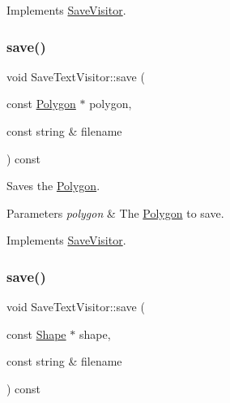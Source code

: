 Implements \hyperlink{class_save_visitor_aa94777a1d367e937294ffd467835dc31}{Save\+Visitor}.

\hypertarget{class_save_text_visitor_a9b4292ce11779caf26556cf6abc5db0f}{}\label{class_save_text_visitor_a9b4292ce11779caf26556cf6abc5db0f} 
\subsubsection{\texorpdfstring{save()}{save()}\hspace{0.1cm}{\footnotesize\ttfamily [4/5]}}
{\footnotesize\ttfamily void Save\+Text\+Visitor\+::save (\begin{DoxyParamCaption}\item[{const \hyperlink{class_polygon}{Polygon} $\ast$}]{polygon,  }\item[{const string \&}]{filename }\end{DoxyParamCaption}) const\hspace{0.3cm}{\ttfamily [virtual]}}

Saves the \hyperlink{class_polygon}{Polygon}. 
\begin{DoxyParams}{Parameters}
{\em polygon} & The \hyperlink{class_polygon}{Polygon} to save. \\
\hline
\end{DoxyParams}


Implements \hyperlink{class_save_visitor_aa24d8ccd081233a49ad31396e265af81}{Save\+Visitor}.

\hypertarget{class_save_text_visitor_aa73d6b9e27e6b95d058c089fb4900514}{}\label{class_save_text_visitor_aa73d6b9e27e6b95d058c089fb4900514} 
\subsubsection{\texorpdfstring{save()}{save()}\hspace{0.1cm}{\footnotesize\ttfamily [5/5]}}
{\footnotesize\ttfamily void Save\+Text\+Visitor\+::save (\begin{DoxyParamCaption}\item[{const \hyperlink{class_shape}{Shape} $\ast$}]{shape,  }\item[{const string \&}]{filename }\end{DoxyParamCaption}) const\hspace{0.3cm}{\ttfamily [virtual]}}

